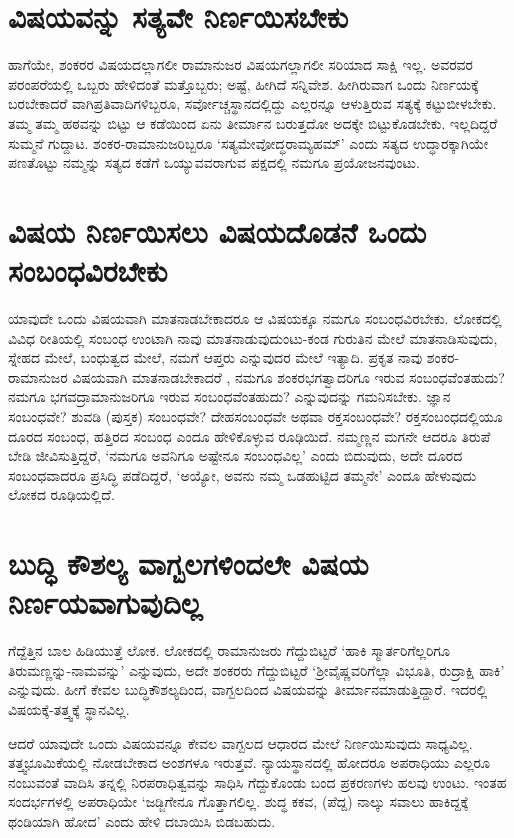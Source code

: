 \section*{ವಿಷಯವನ್ನು ಸತ್ಯವೇ ನಿರ್ಣಯಿಸಬೇಕು}

ಹಾಗೆಯೇ, ಶಂಕರರ ವಿಷಯದಲ್ಲಾಗಲೀ ರಾಮಾನುಜರ ವಿಷಯಗಲ್ಲಾಗಲೀ ಸರಿಯಾದ ಸಾಕ್ಷಿ ಇಲ್ಲ. ಅವರವರ ಪರಂಪರೆಯಲ್ಲಿ ಒಬ್ಬರು ಹೇಳಿದಂತೆ ಮತ್ತೊಬ್ಬರು; ಅಷ್ಟೆ, ಹೀಗಿದೆ ಸನ್ನಿವೇಶ. ಹೀಗಿರುವಾಗ ಒಂದು ನಿರ್ಣಯಕ್ಕೆ ಬರಬೇಕಾದರೆ ವಾಗಿಪ್ರತಿವಾದಿಗಳಿಬ್ಬರೂ, ಸರ್ವೋಚ್ಚಸ್ಥಾನದಲ್ಲಿದ್ದು ಎಲ್ಲರನ್ನೂ ಆಳುತ್ತಿರುವ ಸತ್ಯಕ್ಕೆ ಕಟ್ಟುಬೀಳಬೇಕು. ತಮ್ಮ ತಮ್ಮ ಹಠವನ್ನು ಬಿಟ್ಟು ಆ ಕಡೆಯಿಂದ ಏನು ತೀರ್ಮಾನ ಬರುತ್ತದೋ ಅದಕ್ಕೇ ಬಿಟ್ಟುಕೊಡಬೇಕು. ಇಲ್ಲದಿದ್ದರೆ ಸುಮ್ಮನೆ ಗುದ್ದಾಟ. ಶಂಕರ-ರಾಮಾನುಜರಿಬ್ಬರೂ `ಸತ್ಯಮೇವೋದ್ಧರಾಮ್ಯಹಮ್'\label{40} ಎಂದು ಸತ್ಯದ ಉದ್ಧಾರಕ್ಕಾಗಿಯೇ ಪಣತೊಟ್ಟು ನಮ್ಮನ್ನು ಸತ್ಯದ ಕಡೆಗೆ ಒಯ್ಯುವವರಾಗುವ ಪಕ್ಷದಲ್ಲಿ ನಮಗೂ ಪ್ರಯೋಜನವುಂಟು.

\section*{ವಿಷಯ ನಿರ್ಣಯಿಸಲು ವಿಷಯದೊಡನೆ ಒಂದು ಸಂಬಂಧವಿರಬೇಕು}

ಯಾವುದೇ ಒಂದು ವಿಷಯವಾಗಿ ಮಾತನಾಡಬೇಕಾದರೂ ಆ ವಿಷಯಕ್ಕೂ ನಮಗೂ ಸಂಬಂಧವಿರಬೇಕು. ಲೋಕದಲ್ಲಿ ವಿವಿಧ ರೀತಿಯಲ್ಲಿ ಸಂಬಂಧ ಉಂಟಾಗಿ ನಾವು ಮಾತನಾಡುವುದುಂಟು-ಕಂಡ ಗುರುತಿನ ಮೇಲೆ ಮಾತನಾಡಿಸುವುದು, ಸ್ನೇಹದ ಮೇಲೆ, ಬಂಧುತ್ವದ ಮೇಲೆ, ನಮಗೆ ಆಪ್ತರು ಎನ್ನುವುದರ ಮೇಲೆ ಇತ್ಯಾದಿ. ಪ್ರಕೃತ ನಾವು ಶಂಕರ-ರಾಮಾನುಜರ ವಿಷಯವಾಗಿ ಮಾತನಾಡಬೇಕಾದರೆ , ನಮಗೂ ಶಂಕರಭಗತ್ವಾದರಿಗೂ ಇರುವ ಸಂಬಂಧವೆಂತಹುದು? ನಮಗೂ ಭಗವದ್ರಾಮಾನುಜರಿಗೂ ಇರುವ ಸಂಬಂಧವೆಂತಹುದು? ಎನ್ನುವುದನ್ನು ಗಮನಿಸಬೇಕು. ಜ್ಞಾನ ಸಂಬಂಧವೇ? ಶುವಡಿ (ಪುಸ್ತಕ) ಸಂಬಂಧವೇ? ದೇಹಸಂಬಂಧವೇ ಅಥವಾ ರಕ್ತಸಂಬಂಧವೇ? ರಕ್ತಸಂಬಂಧದಲ್ಲಿಯೂ ದೂರದ ಸಂಬಂಧ, ಹತ್ತಿರದ ಸಂಬಂಧ ಎಂದೂ ಹೇಳಿಕೊಳ್ಳುವ ರೂಢಿಯಿದೆ. ನಮ್ಮಣ್ಣನ ಮಗನೇ ಆದರೂ ತಿರುಪೆ ಬೇಡಿ ಜೀವಿಸುತ್ತಿದ್ದರೆ, `ನಮಗೂ ಅವನಿಗೂ ಅಷ್ಟೇನೂ ಸಂಬಂಧವಿಲ್ಲ' ಎಂದು ಬಿದುವುದು, ಅದೇ ದೂರದ ಸಂಬಂಧವಾದರೂ ಪ್ರಸಿದ್ಧಿ ಪಡೆದಿದ್ದರೆ, `ಅಯ್ಯೋ, ಅವನು ನಮ್ಮ ಒಡಹುಟ್ಟಿದ ತಮ್ಮನೇ' ಎಂದೂ ಹೇಳುವುದು ಲೋಕದ ರೂಢಿಯಲ್ಲಿದೆ.

\section*{ಬುದ್ಧಿ ಕೌಶಲ್ಯ ವಾಗ್ಬಲಗಳಿಂದಲೇ ವಿಷಯ ನಿರ್ಣಯವಾಗುವುದಿಲ್ಲ}

ಗೆದ್ದೆತ್ತಿನ ಬಾಲ ಹಿಡಿಯುತ್ತೆ ಲೋಕ. ಲೋಕದಲ್ಲಿ ರಾಮಾನುಜರು ಗೆದ್ದುಬಿಟ್ಟರೆ `ಹಾಕಿ ಸ್ಮಾರ್ತರಿಗೆಲ್ಲರಿಗೂ ತಿರುಮಣ್ಣನ್ನು-ನಾಮವನ್ನು' ಎನ್ನುವುದು, ಅದೇ ಶಂಕರರು ಗೆದ್ದುಬಿಟ್ಟರೆ `ಶ್ರೀವೈಷ್ಣವರಿಗೆಲ್ಲಾ ವಿಭೂತಿ, ರುದ್ರಾಕ್ಷಿ ಹಾಕಿ' ಎನ್ನುವುದು. ಹೀಗೆ ಕೇವಲ ಬುದ್ಧಿಕೌಶಲ್ಯದಿಂದ, ವಾಗ್ಬಲದಿಂದ ವಿಷಯವನ್ನು  ತೀರ್ಮಾನಮಾಡುತ್ತಿದ್ದಾರೆ. ಇದರಲ್ಲಿ ವಿಷಯಕ್ಕೆ-ತತ್ತ್ವಕ್ಕೆ ಸ್ಥಾನವಿಲ್ಲ.

ಆದರೆ ಯಾವುದೇ ಒಂದು ವಿಷಯವನ್ನೂ ಕೇವಲ ವಾಗ್ಬಲದ ಆಧಾರದ ಮೇಲೆ ನಿರ್ಣಯಿಸುವುದು ಸಾಧ್ಯವಿಲ್ಲ. ತತ್ತ್ವಭೂಮಿಕೆಯಲ್ಲಿ ನೋಡಬೇಕಾದ ಅಂಶಗಳೂ ಇರುತ್ತವೆ. ನ್ಯಾಯಸ್ಥಾನದಲ್ಲಿ ಹೋದರೂ ಅಪರಾಧಿಯು ಎಲ್ಲರೂ ನಂಬುವಂತೆ ವಾದಿಸಿ ತನ್ನಲ್ಲಿ ನಿರಪರಾಧಿತ್ವವನ್ನು ಸಾಧಿಸಿ ಗೆದ್ದುಕೊಂಡು ಬಂದ ಪ್ರಕರಣಗಳು ಹಲವು ಉಂಟು. ಇಂತಹ ಸಂದರ್ಭಗಳಲ್ಲಿ ಅಪರಾಧಿಯೇ `ಜಡ್ಜಿಗೇನೂ ಗೊತ್ತಾಗಲಿಲ್ಲ. ಶುದ್ಧ ಕಕವ, (ಪೆದ್ದ) ನಾಲ್ಕು ಸವಾಲು ಹಾಕಿದ್ದಕ್ಕೆ ಥಂಡಿಯಾಗಿ ಹೋದ' ಎಂದು ಹೇಳಿ ದಬಾಯಿಸಿ ಬಿಡಬಹುದು.

